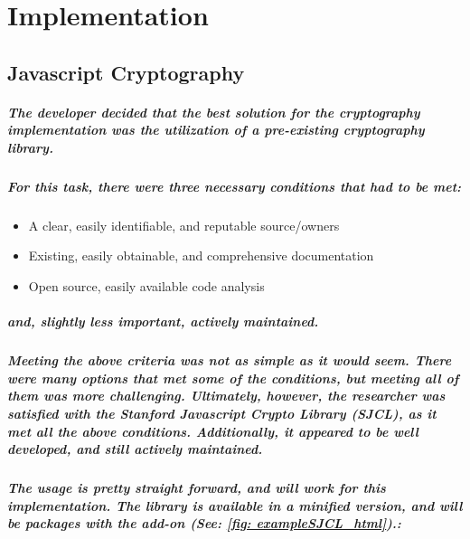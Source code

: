 \chapter{Implementation}

\section{Javascript Cryptography}

\paragraph{The developer decided that the best solution for the cryptography implementation was the utilization of a pre-existing cryptography library.}

\paragraph{For this task, there were three necessary conditions that had to be met:}

\begin{itemize}
\item A clear, easily identifiable, and reputable source/owners
\item Existing, easily obtainable, and comprehensive documentation
\item Open source, easily available code analysis
\end{itemize}

\paragraph{and, slightly less important, actively maintained.}

\paragraph{Meeting the above criteria was not as simple as it would seem. There were many options that met some of the conditions, but meeting all of them was more challenging. Ultimately, however, the researcher was satisfied with the Stanford Javascript Crypto Library (SJCL), as it met all the above conditions. Additionally, it appeared to be well developed, and still actively maintained.}\cite[Website]{SJCL}

\paragraph{The usage is pretty straight forward, and will work for this implementation. The library is available in a minified version, and will be packages with the add-on (See: \ref{fig: exampleSJCL_html}).:}

